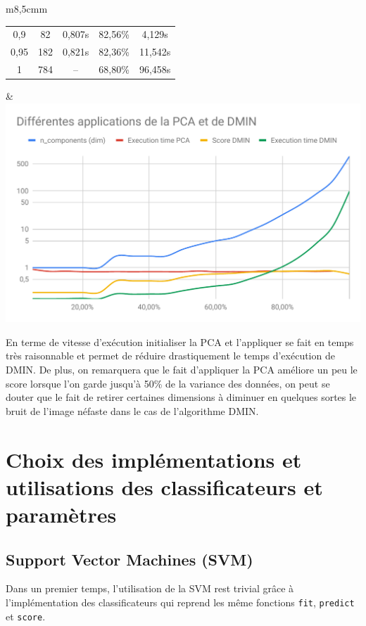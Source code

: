 \documentclass[12pt,a4paper]{article}
\begin{document}
{\begin{tabular}{m{}m{}}
\begin{tabular}{|c|c|c|c|c|}
        0,9          & 82             & 0,807s                   & 82,56\%          & 4,129s     \\
        0,95         & 182            & 0,821s                   & 82,36\%          & 11,542s    \\
        1            & 784            & --                       & 68,80\%          & 96,458s    \\
        \hline
    \end{tabular} & \includegraphics[scale=0.4]{PCA+DMIN.pdf} \\
\end{tabular}

En terme de vitesse d'exécution initialiser la PCA et l'appliquer se fait en temps très raisonnable et permet de réduire drastiquement le temps d'exécution de DMIN. De plus, on remarquera que le fait d'appliquer la PCA améliore un peu le score lorsque l'on garde jusqu'à 50\% de la variance des données, on peut se douter que le fait de retirer certaines dimensions à diminuer en quelques sortes le bruit de l'image néfaste dans le cas de l'algorithme DMIN.

\newpage

\section{Choix des implémentations et utilisations des classificateurs et paramètres}

\subsection{Support Vector Machines (SVM)}

Dans un premier temps, l'utilisation de la SVM rest trivial grâce à l'implémentation des classificateurs qui reprend les même fonctions \lstinline[style=default]|fit|, \lstinline[style=default]|predict| et \lstinline[style=default]|score|.

}
\end{document}
